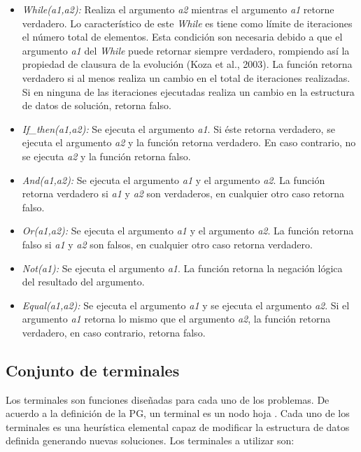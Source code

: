 \begin{itemize}

\item \emph{While(a1,a2):} Realiza el argumento \emph{a2} mientras el argumento \emph{a1} retorne verdadero. Lo característico de este \emph{While} es tiene como límite de iteraciones el número total de elementos. Esta condición son necesaria debido a que el argumento \emph{a1} del \emph{While} puede retornar siempre verdadero, rompiendo así la propiedad de clausura de la evolución (Koza et al., 2003). La función retorna verdadero si al menos realiza un cambio en el total de iteraciones realizadas. Si en ninguna de las iteraciones ejecutadas realiza un cambio en la estructura de datos de solución, retorna falso.

\item \emph{If\_then(a1,a2):} Se ejecuta el argumento \emph{a1}. Si éste retorna verdadero, se ejecuta el argumento \emph{a2} y la función retorna verdadero. En caso contrario, no se ejecuta \emph{a2} y la función retorna falso.

\item \emph{And(a1,a2):} Se ejecuta el argumento \emph{a1} y el argumento \emph{a2}. La función retorna verdadero si \emph{a1} y \emph{a2} son verdaderos, en cualquier otro caso retorna falso.

\item \emph{Or(a1,a2):} Se ejecuta el argumento \emph{a1} y el argumento \emph{a2}. La función retorna falso si \emph{a1} y \emph{a2} son falsos, en cualquier otro caso retorna verdadero.

\item \emph{Not(a1):} Se ejecuta el argumento \emph{a1}. La función retorna la negación lógica del resultado del argumento.

\item \emph{Equal(a1,a2):} Se ejecuta el argumento \emph{a1} y se ejecuta el argumento \emph{a2}. Si el argumento \emph{a1} retorna lo mismo que el argumento \emph{a2}, la función retorna verdadero, en caso contrario, retorna falso.
\end{itemize}

\subsection{Conjunto de terminales}

Los terminales son funciones diseñadas para cada uno de los problemas. De acuerdo a la definición de la PG, un terminal es un nodo hoja \citep{koza_poli_2005}. Cada uno de los terminales es una heurística elemental capaz de modificar la estructura de datos definida generando nuevas soluciones. Los terminales a utilizar son:

